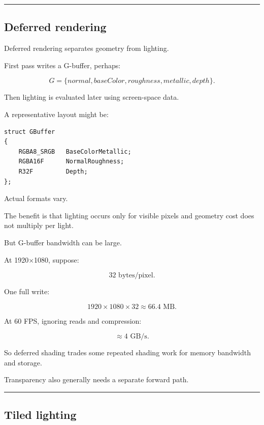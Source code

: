 \begin{center}\rule{0.5\linewidth}{0.5pt}\end{center}

\subsection{Deferred rendering}\label{04-visual-computing-ii-ch040-deferred-rendering}

\hypertarget{04-visual-computing-ii-ch040-deferred-rendering}{}

Deferred rendering separates geometry from lighting.

First pass writes a G-buffer, perhaps:

\[
G=
\{
normal,
baseColor,
roughness,
metallic,
depth
\}.
\]

Then lighting is evaluated later using screen-space data.

A representative layout might be:

\begin{verbatim}
struct GBuffer
{
    RGBA8_SRGB   BaseColorMetallic;
    RGBA16F      NormalRoughness;
    R32F         Depth;
};
\end{verbatim}

Actual formats vary.

The benefit is that lighting occurs only for visible pixels and geometry cost does not multiply per light.

But G-buffer bandwidth can be large.

At 1920×1080, suppose:

\[
32\text{ bytes/pixel}.
\]

One full write:

\[
1920\times1080\times32
\approx66.4\text{ MB}.
\]

At 60 FPS, ignoring reads and compression:

\[
\approx4\text{ GB/s}.
\]

So deferred shading trades some repeated shading work for memory bandwidth and storage.

Transparency also generally needs a separate forward path.

\begin{center}\rule{0.5\linewidth}{0.5pt}\end{center}

\subsection{Tiled lighting}\label{04-visual-computing-ii-ch040-tiled-lighting}

